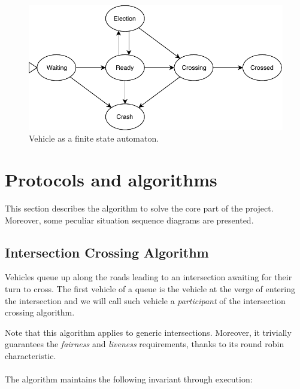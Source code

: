 \documentclass{memoir}
\begin{document}
\begin{figure}
	\centering
	\includegraphics[width=0.8\linewidth]{vehicle_automaton.pdf}
	\caption{Vehicle as a finite state automaton.}
	\label{fig:vehicle-automaton}
\end{figure}

\section{Protocols and algorithms}
This section describes the algorithm to solve the core part of the project. Moreover, some peculiar situation sequence diagrams are presented.

\subsection{Intersection Crossing Algorithm}
Vehicles queue up along the roads leading to an intersection awaiting for their turn to cross. The first vehicle of a queue is the vehicle at the verge of entering the intersection and we will call such vehicle a \emph{participant} of the intersection crossing algorithm.

Note that this algorithm applies to generic intersections. Moreover, it trivially guarantees the \emph{fairness} and \emph{liveness} requirements, thanks to its round robin characteristic.
\\\\
\noindent
The algorithm maintains the following invariant through execution:
\end{document}
